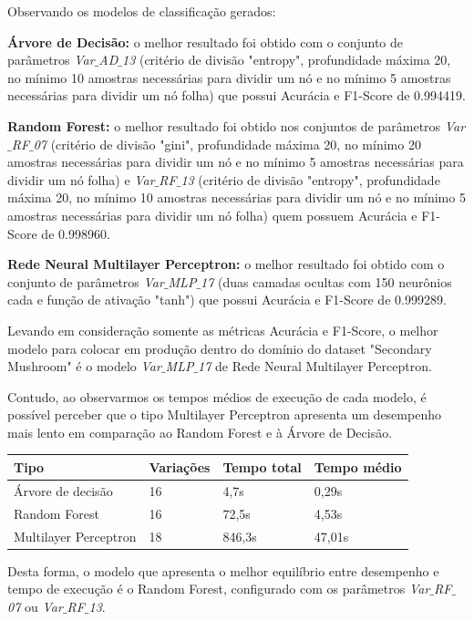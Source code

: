 \documentclass[12pt,a4paper]{article}
\begin{document}
\quad\space Observando os modelos de classificação gerados:

\begin{flushleft}
	\textbf{Árvore de Decisão:} o melhor resultado foi obtido com o conjunto de parâmetros \textit{Var$\_$AD$\_$13} (critério de divisão "entropy", profundidade máxima 20, no mínimo 10 amostras necessárias para dividir um nó e no mínimo 5 amostras necessárias para dividir um nó folha) que possui Acurácia e F1-Score de 0.994419.
	
	\vspace{0.5cm}
	\textbf{Random Forest:} o melhor resultado foi obtido nos conjuntos de parâmetros \textit{Var$\_$RF$\_$07} (critério de divisão "gini", profundidade máxima 20, no mínimo 20 amostras necessárias para dividir um nó e no mínimo 5 amostras necessárias para dividir um nó folha) e \textit{Var$\_$RF$\_$13} (critério de divisão "entropy", profundidade máxima 20, no mínimo 10 amostras necessárias para dividir um nó e no mínimo 5 amostras necessárias para dividir um nó folha) quem possuem Acurácia e F1-Score de 0.998960.
	
	\vspace{0.5cm}
	\textbf{Rede Neural Multilayer Perceptron:} o melhor resultado foi obtido com o conjunto de parâmetros \textit{Var$\_$MLP$\_$17} (duas camadas ocultas com 150 neurônios cada e função de ativação "tanh") que possui Acurácia e F1-Score de 0.999289.
	
	\vspace{0.5cm}
	\quad\space Levando em consideração somente as métricas Acurácia e F1-Score, o melhor modelo para colocar em produção dentro do domínio do dataset "Secondary Mushroom" é o modelo \textit{Var$\_$MLP$\_$17} de Rede Neural Multilayer Perceptron. 

	\quad\space Contudo, ao observarmos os tempos médios de execução de cada modelo, é possível perceber que o tipo Multilayer Perceptron apresenta um desempenho mais lento em comparação ao Random Forest e à Árvore de Decisão.


	\begin{table}[h]
		\centering
		\begin{tabular}{|l|l|l|l|}
			\hline
			\textbf{Tipo} & \textbf{Variações} & \textbf{Tempo total} & \textbf{Tempo médio} \\
			\hline
			Árvore de decisão & 16 & 4,7s & 0,29s \\
			\hline
			Random Forest & 16 & 72,5s & 4,53s \\
			\hline
			Multilayer Perceptron & 18 & 846,3s & 47,01s \\
			\hline
		\end{tabular}
	\end{table}
	
	Desta forma, o modelo que apresenta o melhor equilíbrio entre desempenho e tempo de execução é o Random Forest, configurado com os parâmetros \textit{Var$\_$RF$\_$07} ou \textit{Var$\_$RF$\_$13}.
\end{flushleft}
\end{document}
